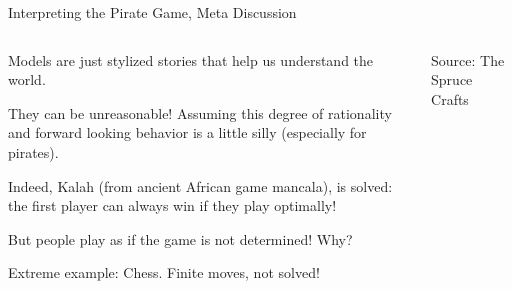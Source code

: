 \documentclass[aspectratio=169]{beamer}
\newenvironment{wideitemize}{\itemize\addtolength{\itemsep}{10pt}}{\enditemize}
\begin{document}
\begin{frame}{Interpreting the Pirate Game, Meta Discussion}
    \begin{columns}[T] %
\begin{column}{.63\textwidth}
    \begin{wideitemize}
        \item Models are just stylized stories that help us understand the world.
        \item They can be unreasonable! Assuming this degree of rationality and forward looking behavior is a little silly (especially for pirates).
        \item Indeed, Kalah (from ancient African game mancala), is solved: the first player can always win if they play optimally!
        \item But people play as if the game is not determined! Why?
        \item Extreme example: Chess. Finite moves, not solved!
    \end{wideitemize}
\end{column}%
\hfill%
\begin{column}{.34\textwidth}
\vspace{20mm}

  \hfill Source: The Spruce Crafts
\end{column}%
\end{columns}
\end{frame}
\end{document}
